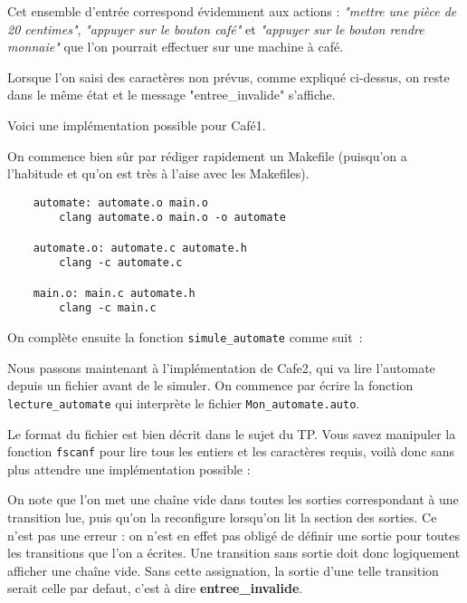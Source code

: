 \documentclass[10pt]{article}
\begin{document}
\begin{enumerate}[label=\textbf{[\alph*]}]
  Cet ensemble d'entrée correspond évidemment aux actions :
  \textit{"mettre une pièce de 20 centimes"}, \textit{"appuyer sur le
    bouton café"} et \textit{"appuyer sur le bouton rendre monnaie"} que l'on
  pourrait effectuer sur une machine à café.

\item Lorsque l'on saisi des caractères non prévus, comme expliqué
  ci-dessus, on reste dans le même état et le message
  "entree\_invalide" s'affiche.

\item Voici une implémentation possible pour Café1.
  \vspace{0.2cm}

  On commence bien sûr par rédiger rapidement un Makefile (puisqu'on a
  l'habitude et qu'on est très à l'aise avec les Makefiles).

  \lstset{style=none}
  \begin{lstlisting}
    automate: automate.o main.o
        clang automate.o main.o -o automate

    automate.o: automate.c automate.h
	    clang -c automate.c

    main.o: main.c automate.h
	    clang -c main.c
  \end{lstlisting}
  \vspace{0.2cm}

  \newpage
  On complète ensuite la fonction \texttt{simule\_automate} comme
  suit~:

  \lstset{style=customc}
  
  \vspace{0.2cm}

\item Nous passons maintenant à l'implémentation de Cafe2, qui va lire
  l'automate depuis un fichier avant de le simuler. On commence par
  écrire la fonction \texttt{lecture\_automate} qui interprète le
  fichier \texttt{Mon\_automate.auto}.
  \vspace{0.2cm}

  Le format du fichier est bien décrit dans le sujet du TP. Vous savez
  manipuler la fonction \texttt{fscanf} pour lire tous les entiers et
  les caractères requis, voilà donc sans plus attendre une
  implémentation possible :

  \lstset{style=customc}
  
  \vspace{0.2cm}

  On note que l'on met une chaîne vide dans toutes les sorties
  correspondant à une transition lue, puis qu'on la reconfigure
  lorsqu'on lit la section des sorties. Ce n'est pas une erreur : on
  n'est en effet pas obligé de définir une sortie pour toutes les
  transitions que l'on a écrites. Une transition sans sortie doit donc
  logiquement afficher une chaîne vide. Sans cette assignation, la
  sortie d'une telle transition serait celle par defaut, c'est à dire
  \textbf{entree\_invalide}.


\end{enumerate}
\end{document}
